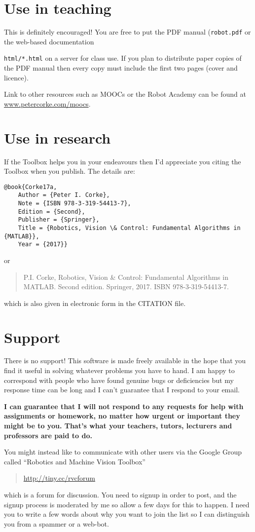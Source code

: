 \documentclass[a4paper,twoside]{report}
\begin{document}
\section{Use in teaching}
This is definitely encouraged!
You are free to put the PDF manual (\texttt{robot.pdf} or the web-based documentation {\texttt{html/*.html} on a server for class
use.
If you plan to distribute paper copies of the PDF manual then every copy must include the first two pages (cover and licence).

Link to other resources such as MOOCs or the Robot Academy can be found at \url{www.petercorke.com/moocs}.

\section{Use in research}
If the Toolbox helps you in your endeavours then I'd appreciate you citing the Toolbox when you publish.
The details are:
\begin{verbatim}
@book{Corke17a,
    Author = {Peter I. Corke},
    Note = {ISBN 978-3-319-54413-7},
    Edition = {Second},
    Publisher = {Springer},
    Title = {Robotics, Vision \& Control: Fundamental Algorithms in {MATLAB}},
    Year = {2017}}
\end{verbatim}
or
\begin{quote}
P.I. Corke, Robotics, Vision \& Control: Fundamental Algorithms in MATLAB. Second edition. Springer, 2017. ISBN 978-3-319-54413-7.
\end{quote}
which is also given in electronic form in the CITATION file.

\section{Support}
There is no support!  This software is made freely available in the hope that you find it useful in solving whatever problems
you have to hand.
I am happy to correspond with people who have found genuine
bugs or deficiencies but my response time can be long and I can't guarantee that I respond to your email.

\textbf{I can guarantee that I will not respond to any requests for help with assignments or homework, no matter
how urgent or important they might be to you.  That's what your teachers, tutors, lecturers and professors are paid to do.}

You might instead like to communicate with other users via 
the Google Group called ``Robotics and Machine Vision Toolbox'' 
\begin{quote}
\url{http://tiny.cc/rvcforum}
\end{quote}
which is a forum for discussion.
You need to signup in order to post, and the signup process is moderated by me so allow a few
days for this to happen.  I need you to write a few words about why you want to join the list
so I can distinguish you from a spammer or a web-bot.

}
\end{document}
